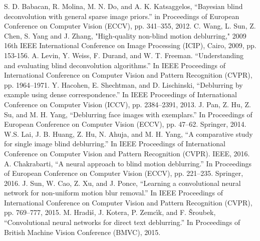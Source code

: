 \documentclass[journal]{IEEEtran}
\begin{document}
\begin{thebibliography}{1}
		S. D. Babacan, R. Molina, M. N. Do, and A. K. Katsaggelos, ``Bayesian blind deconvolution with general sparse image priors.'' in Proceedings of European Conference on Computer Vision (ECCV), pp. 341–355, 2012.
		C. Wang, L. Sun, Z. Chen, S. Yang and J. Zhang, "High-quality non-blind motion deblurring," 2009 16th IEEE International Conference on Image Processing (ICIP), Cairo, 2009, pp. 153-156.
			A. Levin, Y. Weiss, F. Durand, and W. T. Freeman. ``Understanding and evaluating blind deconvolution algorithms.'' In IEEE Proceedings of International Conference on Computer Vision and Pattern Recognition (CVPR), pp. 1964–1971.
		Y. Hacohen, E. Shechtman, and D. Lischinski, ``Deblurring by example using dense correspondence.'' In IEEE Proceedings of International Conference on Computer Vision (ICCV), pp. 2384–2391, 2013.
		J. Pan, Z. Hu, Z. Su, and M. H. Yang, ``Deblurring face images with exemplars.'' In Proceedings of European Conference on Computer Vision (ECCV), pp. 47–62. Springer, 2014.
		W.S. Lai, J. B. Huang, Z. Hu, N. Ahuja, and M. H. Yang, ``A comparative study for single image blind deblurring.'' In IEEE Proceedings of International Conference on Computer Vision and Pattern Recognition (CVPR). IEEE, 2016.
	A. Chakrabarti, ``A neural approach to blind motion deblurring.'' In Proceedings of European Conference on Computer Vision (ECCV), pp. 221–235. Springer, 2016.
		J. Sun, W. Cao, Z. Xu, and J. Ponce, ``Learning a convolutional neural network for non-uniform motion blur removal.'' In IEEE Proceedings of International Conference on Computer Vision and Pattern Recognition (CVPR), pp. 769–777, 2015.
		M. Hradiš, J. Kotera, P. Zemcı́k, and F. Šroubek, ``Convolutional neural networks for direct text deblurring.'' In Proceedings of British Machine Vision Conference (BMVC), 2015.


\end{thebibliography}
\end{document}
